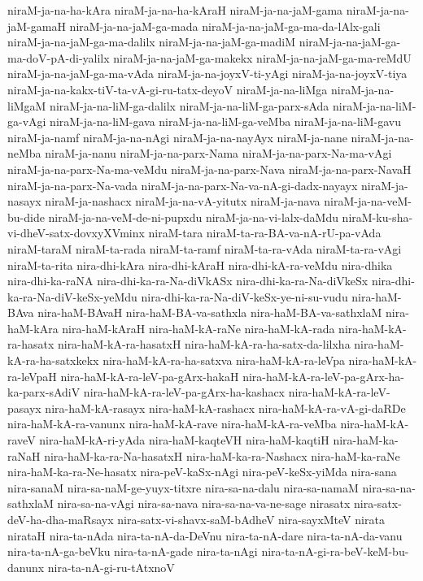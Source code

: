 {niraM-ja-na-ha-kAra
niraM-ja-na-ha-kAraH
niraM-ja-na-jaM-gama
niraM-ja-na-jaM-gamaH
niraM-ja-na-jaM-ga-mada
niraM-ja-na-jaM-ga-ma-da-lAlx-gali
niraM-ja-na-jaM-ga-ma-dalilx
niraM-ja-na-jaM-ga-madiM
niraM-ja-na-jaM-ga-ma-doV-pA-di-yalilx
niraM-ja-na-jaM-ga-makekx
niraM-ja-na-jaM-ga-ma-reMdU
niraM-ja-na-jaM-ga-ma-vAda
niraM-ja-na-joyxV-ti-yAgi
niraM-ja-na-joyxV-tiya
niraM-ja-na-kakx-tiV-ta-vA-gi-ru-tatx-deyoV
niraM-ja-na-liMga
niraM-ja-na-liMgaM
niraM-ja-na-liM-ga-dalilx
niraM-ja-na-liM-ga-parx-sAda
niraM-ja-na-liM-ga-vAgi
niraM-ja-na-liM-gava
niraM-ja-na-liM-ga-veMba
niraM-ja-na-liM-gavu
niraM-ja-namf
niraM-ja-na-nAgi
niraM-ja-na-nayAyx
niraM-ja-nane
niraM-ja-na-neMba
niraM-ja-nanu
niraM-ja-na-parx-Nama
niraM-ja-na-parx-Na-ma-vAgi
niraM-ja-na-parx-Na-ma-veMdu
niraM-ja-na-parx-Nava
niraM-ja-na-parx-NavaH
niraM-ja-na-parx-Na-vada
niraM-ja-na-parx-Na-va-nA-gi-dadx-nayayx
niraM-ja-nasayx
niraM-ja-nashacx
niraM-ja-na-vA-yitutx
niraM-ja-nava
niraM-ja-na-veM-bu-dide
niraM-ja-na-veM-de-ni-pupxdu
niraM-ja-na-vi-lalx-daMdu
niraM-ku-sha-vi-dheV-satx-dovxyXVminx
niraM-tara
niraM-ta-ra-BA-va-nA-rU-pa-vAda
niraM-taraM
niraM-ta-rada
niraM-ta-ramf
niraM-ta-ra-vAda
niraM-ta-ra-vAgi
niraM-ta-rita
nira-dhi-kAra
nira-dhi-kAraH
nira-dhi-kA-ra-veMdu
nira-dhika
nira-dhi-ka-raNA
nira-dhi-ka-ra-Na-diVkASx
nira-dhi-ka-ra-Na-diVkeSx
nira-dhi-ka-ra-Na-diV-keSx-yeMdu
nira-dhi-ka-ra-Na-diV-keSx-ye-ni-su-vudu
nira-haM-BAva
nira-haM-BAvaH
nira-haM-BA-va-sathxla
nira-haM-BA-va-sathxlaM
nira-haM-kAra
nira-haM-kAraH
nira-haM-kA-raNe
nira-haM-kA-rada
nira-haM-kA-ra-hasatx
nira-haM-kA-ra-hasatxH
nira-haM-kA-ra-ha-satx-da-lilxha
nira-haM-kA-ra-ha-satxkekx
nira-haM-kA-ra-ha-satxva
nira-haM-kA-ra-leVpa
nira-haM-kA-ra-leVpaH
nira-haM-kA-ra-leV-pa-gArx-hakaH
nira-haM-kA-ra-leV-pa-gArx-ha-ka-parx-sAdiV
nira-haM-kA-ra-leV-pa-gArx-ha-kashacx
nira-haM-kA-ra-leV-pasayx
nira-haM-kA-rasayx
nira-haM-kA-rashacx
nira-haM-kA-ra-vA-gi-daRDe
nira-haM-kA-ra-vanunx
nira-haM-kA-rave
nira-haM-kA-ra-veMba
nira-haM-kA-raveV
nira-haM-kA-ri-yAda
nira-haM-kaqteVH
nira-haM-kaqtiH
nira-haM-ka-raNaH
nira-haM-ka-ra-Na-hasatxH
nira-haM-ka-ra-Nashacx
nira-haM-ka-raNe
nira-haM-ka-ra-Ne-hasatx
nira-peV-kaSx-nAgi
nira-peV-keSx-yiMda
nira-sana
nira-sanaM
nira-sa-naM-ge-yuyx-titxre
nira-sa-na-dalu
nira-sa-namaM
nira-sa-na-sathxlaM
nira-sa-na-vAgi
nira-sa-nava
nira-sa-na-va-ne-sage
nirasatx
nira-satx-deV-ha-dha-maRsayx
nira-satx-vi-shavx-saM-bAdheV
nira-sayxMteV
nirata
nirataH
nira-ta-nAda
nira-ta-nA-da-DeVnu
nira-ta-nA-dare
nira-ta-nA-da-vanu
nira-ta-nA-ga-beVku
nira-ta-nA-gade
nira-ta-nAgi
nira-ta-nA-gi-ra-beV-keM-bu-danunx
nira-ta-nA-gi-ru-tAtxnoV
}
